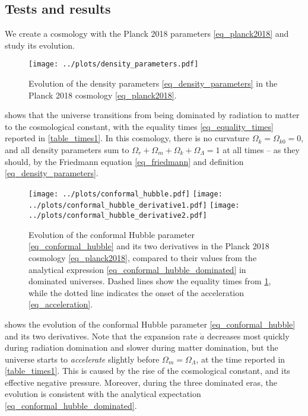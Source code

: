 \documentclass[10pt,a4paper]{article}
\begin{document}
\subsection{Tests and results}

We create a cosmology with the Planck 2018 parameters \eqref{eq_planck2018} and study its evolution.

\begin{figure}[b!]
	\centering
	\texttt{[image: ../plots/density\_parameters.pdf]}
\caption{Evolution of the density parameters \eqref{eq_density_parameters} in the Planck 2018 cosmology \eqref{eq_planck2018}.}
\label{fig_density_parameters}
\end{figure}

 shows that the universe
transitions from being dominated by radiation to matter to the cosmological constant,
with the equality times \eqref{eq_equality_times} reported in \cref{table_times1}.
In this cosmology, there is no curvature $\Omega_{k} = \Omega_{k0} = 0$,
and all density parameters sum to $\Omega_{r} + \Omega_m + \Omega_k + \Omega_\Lambda = 1$ at all times -- as they should, by the Friedmann equation \eqref{eq_friedmann} and definition \eqref{eq_density_parameters}.

\begin{figure}
	\centering
	\texttt{[image: ../plots/conformal\_hubble.pdf]}
	\texttt{[image: ../plots/conformal\_hubble\_derivative1.pdf]}
	\texttt{[image: ../plots/conformal\_hubble\_derivative2.pdf]}
	\caption{%
		Evolution of the conformal Hubble parameter \eqref{eq_conformal_hubble} and its two derivatives in the Planck 2018 cosmology \eqref{eq_planck2018},
		compared to their values from the analytical expression \eqref{eq_conformal_hubble_dominated} in dominated universes.
		Dashed lines show the equality times from \cref{fig_density_parameters},
		while the dotted line indicates the onset of the acceleration \eqref{eq_acceleration}.
	}
	\label{fig_conformal_hubble}
\end{figure}

 shows the evolution of the conformal Hubble parameter \eqref{eq_conformal_hubble} and its two derivatives.
Note that the expansion rate $\dot{a}$ decreases most quickly during radiation domination and slower during matter domination,
but the universe starts to \emph{accelerate} slightly before $\Omega_m = \Omega_\Lambda$, at the time reported in \cref{table_times1}.
This is caused by the rise of the cosmological constant, and its effective negative pressure.
Moreover, during the three dominated eras,
the evolution is consistent with the analytical expectation \eqref{eq_conformal_hubble_dominated}.
\end{document}
